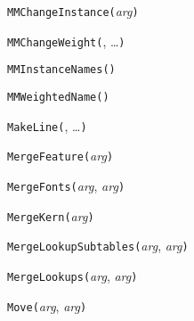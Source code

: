 

\texttt{MMChangeInstance(}\textit{arg}\texttt{)}



\texttt{MMChangeWeight(}, \ldots\texttt{)}



\texttt{MMInstanceNames(}\texttt{)}



\texttt{MMWeightedName(}\texttt{)}



\texttt{MakeLine(}, \ldots\texttt{)}



\texttt{MergeFeature(}\textit{arg}\texttt{)}



\texttt{MergeFonts(}\textit{arg}, \textit{arg}\texttt{)}



\texttt{MergeKern(}\textit{arg}\texttt{)}



\texttt{MergeLookupSubtables(}\textit{arg}, \textit{arg}\texttt{)}



\texttt{MergeLookups(}\textit{arg}, \textit{arg}\texttt{)}



\texttt{Move(}\textit{arg}, \textit{arg}\texttt{)}


